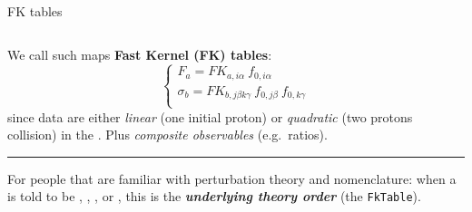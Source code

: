 \documentclass[9pt]{beamer}
\begin{document}
\begin{frame}{FK tables}
\begin{columns}
\begin{column}{0.5\textwidth}
            We call such maps \alert{\textbf{Fast Kernel (FK) tables}}:
            \begin{equation*}
                \begin{cases}
                    F_a = FK_{a, i \alpha}~f_{0, i \alpha}\\
                    \sigma_b = FK_{b, j \beta k \gamma}~f_{0, j \beta}~f_{0, k \gamma}\\
                \end{cases}
            \end{equation*}
            since data are either \textit{linear} (one initial proton) or \textit{quadratic} (two
            protons collision) in the \pdf.\newline
            Plus \textit{composite observables} (e.g.\ ratios).

            \vspace*{15pt}
            \hrule
            \vspace*{15pt}

            For people that are familiar with perturbation theory and \pdf
            nomenclature:\newline
            when a \pdf is told to be \lo, \nlo, \nnlo, or \nnnlo, this
            is the \textit{\textbf{underlying theory order}} (the
            \texttt{FkTable}).
        \end{column}
    \end{columns}
\end{frame}
\end{document}
